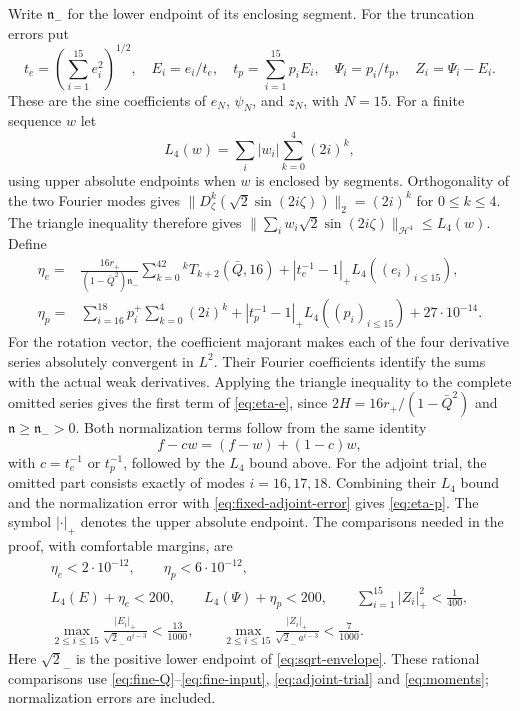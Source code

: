 \documentclass[a4paper,11pt]{article}
\numberwithin{equation}{section}
\theoremstyle{definition}
\theoremstyle{remark}
\newcommand{\norm}[1]{\lVert#1\rVert}
\begin{document}
Write $\mathfrak n_-$ for the lower endpoint of its enclosing segment. For the truncation errors put
\[
 t_e=\left(\sum_{i=1}^{15}e_i^2\right)^{1/2},\quad
 E_i=e_i/t_e,\quad t_p=\sum_{i=1}^{15}p_iE_i,\quad
 \Psi_i=p_i/t_p,\quad Z_i=\Psi_i-E_i.
\]
These are the sine coefficients of $e_N$, $\psi_N$, and $z_N$, with $N=15$. For a finite sequence $w$ let
\[
 L_4(w)=\sum_i |w_i|\sum_{k=0}^4(2i)^k,
\]
using upper absolute endpoints when $w$ is enclosed by segments.
Orthogonality of the two Fourier modes gives
$\norm{D_\zeta^k(\sqrt2\sin(2i\zeta))}_2=(2i)^k$ for $0\le k\le4$.
The triangle inequality therefore gives
$\norm{\sum_i w_i\sqrt2\sin(2i\zeta)}_{\mathcal H^4}\le L_4(w)$.
Define
\begin{align}
 \eta_e={}&\frac{16r_+}{(1-\bar Q^2)\mathfrak n_-}
 \sum_{k=0}^42^kT_{k+2}(\bar Q,16)
 +|t_e^{-1}-1|_+L_4((e_i)_{i\le15}),\label{eq:eta-e}\\
 \eta_p={}&\sum_{i=16}^{18}p_i^+\sum_{k=0}^4(2i)^k
 +|t_p^{-1}-1|_+L_4((p_i)_{i\le15})+27\cdot10^{-14}.
 \label{eq:eta-p}
\end{align}
For the rotation vector, the coefficient majorant makes each of the four
derivative series absolutely convergent in $L^2$. Their Fourier coefficients
identify the sums with the actual weak derivatives. Applying the triangle
inequality to the complete omitted series gives the first term of
\eqref{eq:eta-e}, since $2H=16r_+/(1-\bar Q^2)$ and
$\mathfrak n\ge\mathfrak n_->0$.
Both normalization terms follow from the same identity
\[
 f-cw=(f-w)+(1-c)w,
\]
with $c=t_e^{-1}$ or $t_p^{-1}$, followed by the $L_4$ bound above.
For the adjoint trial, the omitted part consists exactly of modes $i=16,17,18$.
Combining their $L_4$ bound and the normalization error with
\eqref{eq:fixed-adjoint-error} gives \eqref{eq:eta-p}.
The symbol $|\cdot|_+$ denotes the upper absolute endpoint. The comparisons needed in the proof, with comfortable margins, are
\begin{equation}\label{eq:vector-scalar-checks}
\begin{gathered}
 \eta_e<2\cdot10^{-12},\qquad \eta_p<6\cdot10^{-12},\\
 L_4(E)+\eta_e<200,
 \qquad L_4(\Psi)+\eta_p<200,
 \qquad\sum_{i=1}^{15}|Z_i|_+^2<\tfrac1{400},\\
 \max_{2\le i\le15}\frac{|E_i|_+}{\sqrt2_-\,a^{i-3}}<\tfrac{13}{1000},
 \qquad
 \max_{2\le i\le15}\frac{|Z_i|_+}{\sqrt2_-\,a^{i-3}}<\tfrac7{1000}.
\end{gathered}
\end{equation}
Here $\sqrt2_-$ is the positive lower endpoint of \eqref{eq:sqrt-envelope}. These rational comparisons use \eqref{eq:fine-Q}--\eqref{eq:fine-input}, \eqref{eq:adjoint-trial} and \eqref{eq:moments}; normalization errors are included.
\end{document}
